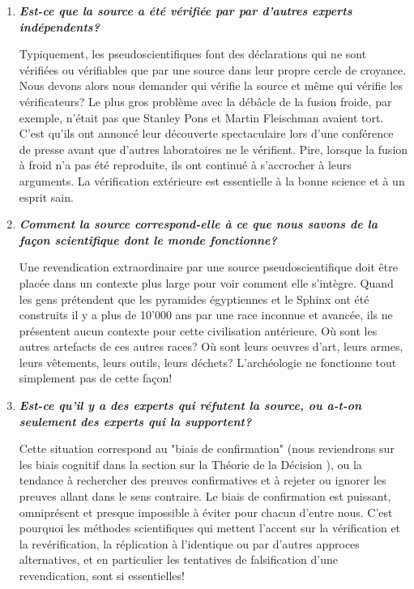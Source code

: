 \begin{enumerate}
		\item \textit{\textbf{Est-ce que la source a été vérifiée par par d'autres experts indépendents?}}
		
		Typiquement, les pseudoscientifiques font des déclarations qui ne sont vérifiées ou vérifiables que par une source dans leur propre cercle de croyance. Nous devons alors nous demander qui vérifie la source et même qui vérifie les vérificateurs? Le plus gros problème avec la débâcle de la fusion froide, par exemple, n'était pas que Stanley Pons et Martin Fleischman avaient tort. C'est qu'ils ont annoncé leur découverte spectaculaire lors d'une conférence de presse avant que d'autres laboratoires ne le vérifient. Pire, lorsque la fusion à froid n'a pas été reproduite, ils ont continué à s'accrocher à leurs arguments. La vérification extérieure est essentielle à la bonne science et à un esprit sain.

		\item \textit{\textbf{Comment la source correspond-elle à ce que nous savons de la façon scientifique dont le monde fonctionne?}}

		Une revendication extraordinaire par une source pseudoscientifique doit être placée dans un contexte plus large pour voir comment elle s'intègre. Quand les gens prétendent que les pyramides égyptiennes et le Sphinx ont été construits il y a plus de 10'000 ans par une race inconnue et avancée, ils ne présentent aucun contexte pour cette civilisation antérieure. Où sont les autres artefacts de ces autres races? Où sont leurs oeuvres d'art, leurs armes, leurs vêtements, leurs outils, leurs déchets? L'archéologie ne fonctionne tout simplement pas de cette façon!

		\item \textit{\textbf{Est-ce qu'il y a des experts qui réfutent la source, ou a-t-on seulement des experts qui la supportent?}}

		Cette situation correspond au "biais de confirmation" (nous reviendrons sur les biais cognitif dans la section sur la Théorie de la Décision \pageref{cognitive bias}), ou la tendance à rechercher des preuves confirmatives et à rejeter ou ignorer les preuves allant dans le sens contraire. Le biais de confirmation est puissant, omniprésent et presque impossible à éviter pour chacun d'entre nous. C'est pourquoi les méthodes scientifiques qui mettent l'accent sur la vérification et la revérification, la réplication à l'identique ou par d'autres approces alternatives, et en particulier les tentatives de falsification d'une revendication, sont si essentielles!


\end{enumerate}
